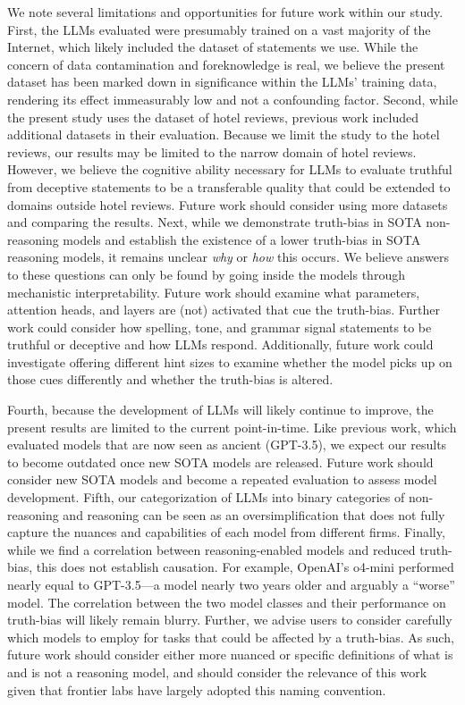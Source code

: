 \documentclass{article}
\begin{document}
We note several limitations and opportunities for future work within our study. First, the LLMs evaluated were presumably trained on a vast majority of the Internet, which likely included the dataset of statements we use. While the concern of data contamination and foreknowledge is real, we believe the present dataset has been marked down in significance within the LLMs' training data, rendering its effect immeasurably low and not a confounding factor. Second, while the present study uses the dataset of hotel reviews, previous work \citep{markowitz_generative_2024} included additional datasets in their evaluation. Because we limit the study to the hotel reviews, our results may be limited to the narrow domain of hotel reviews. However, we believe the cognitive ability necessary for LLMs to evaluate truthful from deceptive statements to be a transferable quality that could be extended to domains outside hotel reviews. Future work should consider using more datasets and comparing the results. Next, while we demonstrate truth-bias in SOTA non-reasoning models and establish the existence of a lower truth-bias in SOTA reasoning models, it remains unclear \textit{why} or \textit{how} this occurs. We believe answers to these questions can only be found by going inside the models through mechanistic interpretability. Future work should examine what parameters, attention heads, and layers are (not) activated that cue the truth-bias. Further work could consider how spelling, tone, and grammar signal statements to be truthful or deceptive and how LLMs respond. Additionally, future work could investigate offering different hint sizes to examine whether the model picks up on those cues differently and whether the truth-bias is altered.

Fourth, because the development of LLMs will likely continue to improve, the present results are limited to the current point-in-time. Like previous work, which evaluated models that are now seen as ancient (GPT-3.5), we expect our results to become outdated once new SOTA models are released. Future work should consider new SOTA models and become a repeated evaluation to assess model development. Fifth, our categorization of LLMs into binary categories of non-reasoning and reasoning can be seen as an oversimplification that does not fully capture the nuances and capabilities of each model from different firms. Finally, while we find a correlation between reasoning-enabled models and reduced truth-bias, this does not establish causation. For example, OpenAI's o4-mini performed nearly equal to GPT-3.5---a model nearly two years older and arguably a ``worse'' model. The correlation between the two model classes and their performance on truth-bias will likely remain blurry. Further, we advise users to consider carefully which models to employ for tasks that could be affected by a truth-bias. As such, future work should consider either more nuanced or specific definitions of what is and is not a reasoning model, and should consider the relevance of this work given that frontier labs have largely adopted this naming convention.
\end{document}
